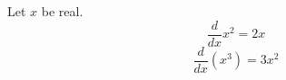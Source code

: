 \documentclass{article}
\begin{document}
Let $x$ be real.
\begin{equation}
\frac{d}{dx} x^2 = 2x
\label{eq:d1}
\end{equation}
\begin{equation}
\frac{d}{dx}\left( x^3 \right) = 3x^2
\label{eq:d2}
\end{equation}
\end{document}
